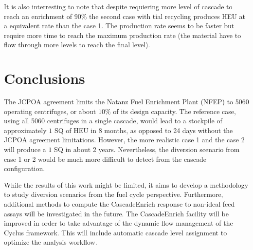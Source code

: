 \documentclass{anstrans}
\begin{document}
It is also interresting to note that despite requiering more level of cascade to
reach an enrichment of $90\%$ the second case with tial recycling produces HEU
at a equivalent rate than the case 1. The production rate seems to be faster but
require more time to reach the maximum production rate (the material have to
flow through more levels to reach the final level).


\section{Conclusions}

The JCPOA agreement limits the Natanz Fuel Enrichment Plant (NFEP) to 5060 operating centrifuges, or about $10\%$ of its design capacity. The reference case, using all 5060 centrifuges in a single cascade, would lead to a stockpile of approximately $1$ SQ of HEU in 8 months, as opposed to 24 days without the
JCPOA agreement limitations. However, the more realistic case 1 and the case 2 will produce a $1$ SQ in about 2 years. Nevertheless, the diversion scenario from case 1 or 2 would be much more difficult to detect from the cascade configuration.

While the results of this work might be limited, it aims to develop a
methodology to study diversion scenarios from the fuel cycle perspective. Furthermore, additional methods to compute the CascadeEnrich response to non-ideal feed assays will be investigated in the future.  The CascadeEnrich facility will be improved in order to take advantage of the dynamic flow management of the Cyclus framework. This will include automatic cascade level assignment to optimize the analysis workflow.
\end{document}
